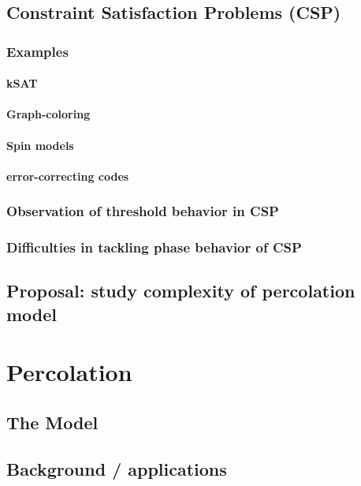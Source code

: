 \documentclass{umthesis}
\begin{document}
\subsection{Constraint Satisfaction Problems (CSP)}
\label{sec-4.1.1}
\subsubsection{Examples}
\label{sec-4.1.1.1}
\paragraph{kSAT}
\label{sec-4.1.1.1.1}
\paragraph{Graph-coloring}
\label{sec-4.1.1.1.2}
\paragraph{Spin models}
\label{sec-4.1.1.1.3}
\paragraph{error-correcting codes}
\label{sec-4.1.1.1.4}
\subsubsection{Observation of threshold behavior in CSP}
\label{sec-4.1.1.2}
\subsubsection{Difficulties in tackling phase behavior of CSP}
\label{sec-4.1.1.3}
\subsection{Proposal: study complexity of percolation model}
\label{sec-4.1.2}
\section{Percolation}
\label{sec-4.2}
\subsection{The Model}
\label{sec-4.2.1}
\subsection{Background / applications}
\label{sec-4.2.2}
\end{document}
